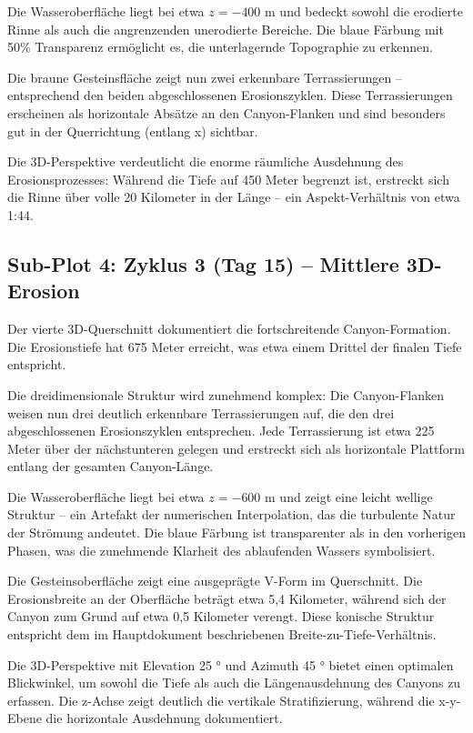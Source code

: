 ﻿\documentclass[12pt,a4paper]{report}
\begin{document}
Die Wasseroberfläche liegt bei etwa $z = -400$ m und bedeckt sowohl die erodierte Rinne als auch die angrenzenden unerodierte Bereiche. Die blaue Färbung mit 50\% Transparenz ermöglicht es, die unterlagernde Topographie zu erkennen.

Die braune Gesteinsfläche zeigt nun zwei erkennbare Terrassierungen -- entsprechend den beiden abgeschlossenen Erosionszyklen. Diese Terrassierungen erscheinen als horizontale Absätze an den Canyon-Flanken und sind besonders gut in der Querrichtung (entlang x) sichtbar.

Die 3D-Perspektive verdeutlicht die enorme räumliche Ausdehnung des Erosionsprozesses: Während die Tiefe auf 450 Meter begrenzt ist, erstreckt sich die Rinne über volle 20 Kilometer in der Länge -- ein Aspekt-Verhältnis von etwa 1:44.

\subsection{Sub-Plot 4: Zyklus 3 (Tag 15) -- Mittlere 3D-Erosion}

Der vierte 3D-Querschnitt dokumentiert die fortschreitende Canyon-Formation. Die Erosionstiefe hat 675 Meter erreicht, was etwa einem Drittel der finalen Tiefe entspricht.

Die dreidimensionale Struktur wird zunehmend komplex: Die Canyon-Flanken weisen nun drei deutlich erkennbare Terrassierungen auf, die den drei abgeschlossenen Erosionszyklen entsprechen. Jede Terrassierung ist etwa 225 Meter über der nächstunteren gelegen und erstreckt sich als horizontale Plattform entlang der gesamten Canyon-Länge.

Die Wasseroberfläche liegt bei etwa $z = -600$ m und zeigt eine leicht wellige Struktur -- ein Artefakt der numerischen Interpolation, das die turbulente Natur der Strömung andeutet. Die blaue Färbung ist transparenter als in den vorherigen Phasen, was die zunehmende Klarheit des ablaufenden Wassers symbolisiert.

Die Gesteinsoberfläche zeigt eine ausgeprägte V-Form im Querschnitt. Die Erosionsbreite an der Oberfläche beträgt etwa 5,4 Kilometer, während sich der Canyon zum Grund auf etwa 0,5 Kilometer verengt. Diese konische Struktur entspricht dem im Hauptdokument beschriebenen Breite-zu-Tiefe-Verhältnis.

Die 3D-Perspektive mit Elevation 25 ° und Azimuth 45 ° bietet einen optimalen Blickwinkel, um sowohl die Tiefe als auch die Längenausdehnung des Canyons zu erfassen. Die z-Achse zeigt deutlich die vertikale Stratifizierung, während die x-y-Ebene die horizontale Ausdehnung dokumentiert.
\end{document}
